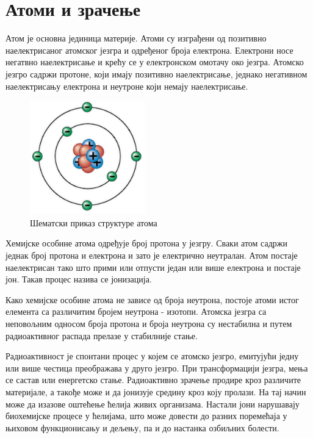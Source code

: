 \documentclass[12pt,a4paper,serbian,oneside]{book}
\begin{document}
\section{Атоми и зрачење}

Атом је основна јединица материје. Атоми су изграђени од позитивно наелектрисаног атомског језгра и одређеног броја електрона. Електрони носе негатвно наелектрисање и крећу се у електронском омотачу око језгра. Атомско језгро садржи протоне, који имају позитивно наелектрисање, једнако негативном наелектрисању електрона и неутроне који немају наелектрисање. 

\begin{figure}[h]
\begin{center}
\leavevmode
\includegraphics[width=50mm]{images/atom.png}
\end{center}
\caption{Шематски приказ структуре атома}
\label{fig:atom}
\end{figure}

Хемијске особине атома одређује број протона у језгру. Сваки атом садржи једнак број протона и електрона и зато је електрично неутралан.  Атом постаје наелектрисан тако што прими или отпусти један или више електрона и постаје јон. Такав процес назива се јонизација.

Како хемијске особине атома не зависе од броја неутрона, постоје атоми истог елемента са различитим бројем неутрона - изотопи. Атомска језгра са неповољним односом броја протона и броја неутрона су нестабилна и путем радиоактивног распада прелазе у стабилније стање.

Радиоактивност је спонтани процес у којем се атомско језгро, емитујући једну или више честица преображава у друго језгро. При трансформацији језгра, мења се састав или енергетско стање. Радиоактивно зрачење продире кроз различите материјале, а такође може и да јонизује средину кроз коју пролази. На тај начин може да изазове оштећење ћелија живих организама. Настали јони нарушавају биохемијске процесе у ћелијама, што може довести до разних поремећаја у њиховом функционисању и дељењу, па и до настанка озбиљних болести.
\end{document}
